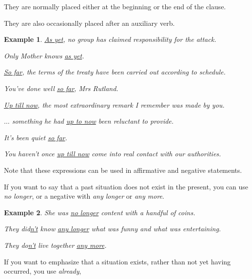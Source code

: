 \documentclass[oneside]{book}
\numberwithin{equation}{section}
\newtheorem{example}{Example}[section]
\begin{document}
They are normally placed either at the beginning or the end of the clause.

They are also occasionally placed after an auxiliary verb.
\begin{example}
    \underline{As yet}, no group has claimed responsibility for the attack.
    
    Only Mother knows \underline{as yet}.
    
    \underline{So far}, the terms of the treaty have been carried out according to schedule.
    
    You've done well \underline{so far}, Mrs Rutland.
    
    \underline{Up till now}, the most extraordinary remark I remember was made by you.
    
    $\ldots$ something he had \underline{up to now} been reluctant to provide.
    
    It's been quiet \underline{so far}.
    
    You haven't once \underline{up till now} come into real contact with our authorities.
\end{example}
Note that these expressions can be used in affirmative and negative statements.

%
\noindent{} If you want to say that a past situation does not exist in the present, you can use \textit{no longer}, or a negative with \textit{any longer} or \textit{any more}.
\begin{example}
    She was \underline{no longer} content with a handful of coins.
    
    They did\underline{n't} know \underline{any longer} what was funny and what was entertaining.
    
    They do\underline{n't} live together \underline{any more}.
\end{example}
%
\noindent{} If you want to emphasize that a situation exists, rather than not yet having occurred, you use \textit{already},
\end{document}

